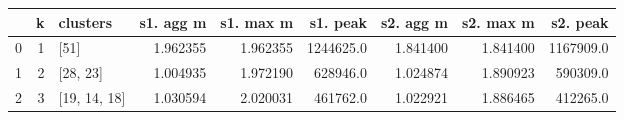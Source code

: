 \begin{tabular}{lrlrrrrrr}
\toprule
{} &  k &      clusters &  s1. agg m &  s1. max m &   s1. peak &  s2. agg m &  s2. max m &   s2. peak \\
\midrule
0 &  1 &          [51] &   1.962355 &   1.962355 &  1244625.0 &   1.841400 &   1.841400 &  1167909.0 \\
1 &  2 &      [28, 23] &   1.004935 &   1.972190 &   628946.0 &   1.024874 &   1.890923 &   590309.0 \\
2 &  3 &  [19, 14, 18] &   1.030594 &   2.020031 &   461762.0 &   1.022921 &   1.886465 &   412265.0 \\
\bottomrule
\end{tabular}
